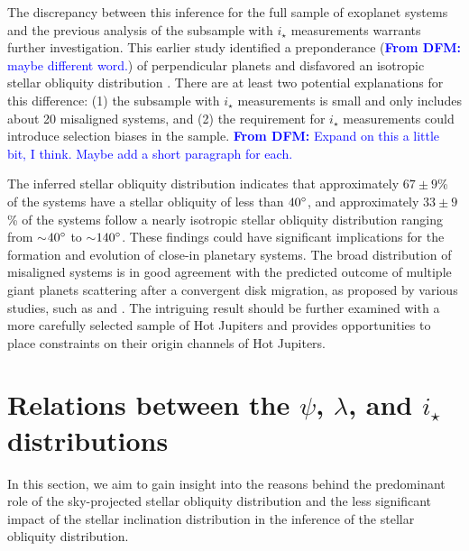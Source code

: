 \documentclass[twocolumn,times]{aastex631}
\newcommand{\dfm}[1]{\textcolor{blue}{\textbf{From DFM:} #1}}
\begin{document}
The discrepancy between this inference for the full sample of exoplanet systems and the previous analysis of the subsample with $i_\star$ measurements \citep{Albrecht21} warrants further investigation.
This earlier study identified a preponderance (\dfm{maybe different word.}) of perpendicular planets and disfavored an isotropic stellar obliquity distribution \citep{Albrecht21}.
There are at least two potential explanations for this difference: (1) the subsample with $i_\star$ measurements is small and only includes about 20 misaligned systems, and (2) the requirement for $i_\star$ measurements could introduce selection biases in the sample.  \dfm{Expand on this a little bit, I think. Maybe add a short paragraph for each.}

The inferred stellar obliquity distribution indicates that approximately $67\pm9$\% of the systems have a stellar obliquity of less than $40\mbox{$^\circ$}$, and approximately $33\pm9$\% of the systems follow a nearly isotropic stellar obliquity distribution ranging from $\sim$$40\mbox{$^\circ$}$ to $\sim$$140\mbox{$^\circ$}$. These findings could have significant implications for the formation and evolution of close-in planetary systems.
The broad distribution of misaligned systems is in good agreement with the predicted outcome of multiple giant planets scattering after a convergent disk migration, as proposed by various studies, such as \cite{Nagasawa11} and \cite{Beague12}. The intriguing result should be further examined with a more carefully selected sample of Hot Jupiters and provides opportunities to place constraints on their origin channels of Hot Jupiters.

\section{Relations between the $\psi$, $\lambda$, and \lowercase{$i_\star$} distributions}\label{sec:jacobian}

In this section, we aim to gain insight into the reasons behind the predominant role of the sky-projected stellar obliquity distribution and the less significant impact of the stellar inclination distribution in the inference of the stellar obliquity distribution.
\end{document}
